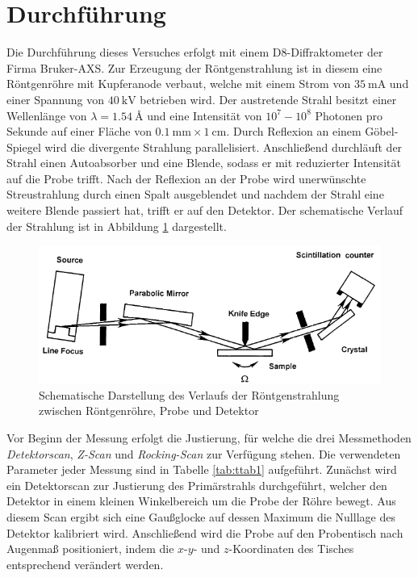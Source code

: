 \section{Durchführung}
\label{sec:Durchführung}
Die Durchführung dieses Versuches erfolgt mit einem D8-Diffraktometer der Firma Bruker-AXS.
Zur Erzeugung der Röntgenstrahlung ist in diesem eine Röntgenröhre mit Kupferanode verbaut, welche mit einem Strom von $\SI{35}{\mA}$ und einer Spannung von $\SI{40}{\kV}$ betrieben wird.
Der austretende Strahl besitzt einer Wellenlänge von $\lambda = \SI{1,54}{\angstrom}$ und eine Intensität von $10^7 - 10^8$ Photonen pro Sekunde auf einer Fläche von $\SI{0,1}{\mm}\times\SI{1}{\cm}$.
Durch Reflexion an einem Göbel-Spiegel wird die divergente Strahlung parallelisiert.
Anschließend durchläuft der Strahl einen Autoabsorber und eine Blende, sodass er mit reduzierter Intensität auf die Probe trifft.
Nach der Reflexion an der Probe wird unerwünschte Streustrahlung durch einen Spalt ausgeblendet und nachdem der Strahl eine weitere Blende passiert hat, trifft er auf den Detektor.
Der schematische Verlauf der Strahlung ist in Abbildung \ref{fig:tfig6} dargestellt.
\begin{figure}[H]
\centering
\includegraphics[width=0.7\linewidth]{figures/Aufbau}
\caption{Schematische Darstellung des Verlaufs der Röntgenstrahlung zwischen Röntgenröhre, Probe und Detektor \cite{skript}}
\label{fig:tfig6}
\end{figure}

Vor Beginn der Messung erfolgt die Justierung, für welche die drei Messmethoden \textit{Detektorscan}, \textit{Z-Scan} und \textit{Rocking-Scan} zur Verfügung stehen.
Die verwendeten Parameter jeder Messung sind in Tabelle \ref{tab:ttab1} aufgeführt.
Zunächst wird ein Detektorscan zur Justierung des Primärstrahls durchgeführt, welcher den Detektor in einem kleinen Winkelbereich um die Probe der Röhre bewegt.
Aus diesem Scan ergibt sich eine Gaußglocke auf dessen Maximum die Nulllage des Detektor kalibriert wird.
Anschließend wird die Probe auf den Probentisch nach Augenmaß positioniert, indem die $x$-$y$- und $z$-Koordinaten des Tisches entsprechend verändert werden.


